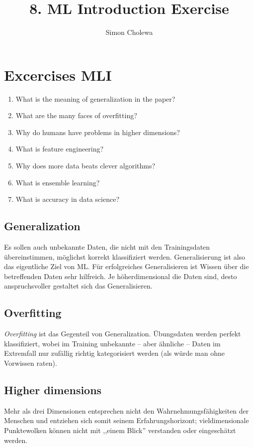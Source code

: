\documentclass[11pt,a4paper]{article}
\author{Simon Cholewa}
\title{8. ML Introduction Exercise}
\begin{document}
\maketitle

\section*{Excercises MLI}

\begin{enumerate}
	\item What is the meaning of generalization in the paper?
	\item What are the many faces of overfitting?
	\item Why do humans have problems in higher dimensions?
	\item What is feature engineering?
	\item Why does more data beats clever algorithms?
	\item What is ensemble learning?
	\item What is accuracy in data science? 
\end{enumerate}

\subsection*{Generalization}
Es sollen auch unbekannte Daten, die nicht mit den Trainingsdaten übereinstimmen, möglichst korrekt klassifiziert werden. Generalisierung ist also das eigentliche Ziel von ML. Für erfolgreiches Generalisieren ist Wissen über die betreffenden Daten sehr hilfreich. Je höherdimensional die Daten sind, desto anspruchsvoller gestaltet sich das Generalisieren.

\subsection*{Overfitting}
\textit{Overfitting} ist das Gegenteil von Generalization. Übungsdaten werden perfekt klassifiziert, wobei im Training unbekannte -- aber ähnliche -- Daten im Extremfall nur zufällig richtig kategorisiert werden (als würde man ohne Vorwissen raten).

\subsection*{Higher dimensions}
Mehr als drei Dimensionen entsprechen nicht den Wahrnehmungsfähigkeiten der Menschen und entziehen sich somit seinem Erfahrungshorizont; vieldimensionale Punktewolken können nicht mit ,,einem Blick'' verstanden oder eingeschätzt werden.
\end{document}
